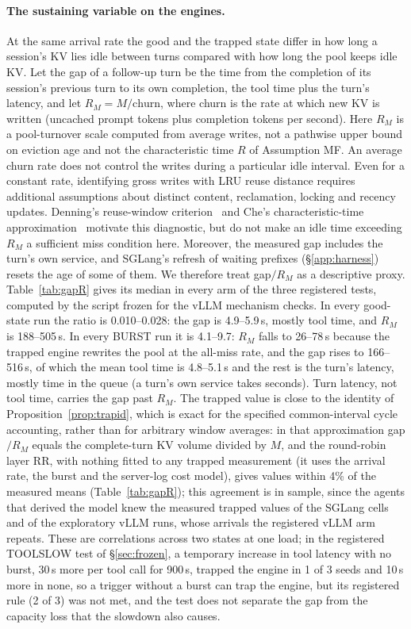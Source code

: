 \paragraph{The sustaining variable on the engines.}\label{sec:mechanism}
At the same arrival rate the good and the trapped state differ in how long a session's KV lies idle between turns compared with how long the pool keeps idle KV. Let the gap of a follow-up turn be the time from the completion of its session's previous turn to its own completion, the tool time plus the turn's latency, and let $R_M=M/\text{churn}$, where churn is the rate at which new KV is written (uncached prompt tokens plus completion tokens per second). Here $R_M$ is a pool-turnover scale computed from average writes, not a pathwise upper bound on eviction age and not the characteristic time $R$ of Assumption MF. An average churn rate does not control the writes during a particular idle interval. Even for a constant rate, identifying gross writes with LRU reuse distance requires additional assumptions about distinct content, reclamation, locking and recency updates. Denning's reuse-window criterion~\citep{denning1968working} and Che's characteristic-time approximation~\citep{che2002hierarchical} motivate this diagnostic, but do not make an idle time exceeding $R_M$ a sufficient miss condition here. Moreover, the measured gap includes the turn's own service, and SGLang's refresh of waiting prefixes (\S\ref{app:harness}) resets the age of some of them. We therefore treat gap$/R_M$ as a descriptive proxy. Table~\ref{tab:gapR} gives its median in every arm of the three registered tests, computed by the script frozen for the vLLM mechanism checks. In every good-state run the ratio is 0.010--0.028: the gap is 4.9--5.9\,s, mostly tool time, and $R_M$ is 188--505\,s. In every BURST run it is 4.1--9.7: $R_M$ falls to 26--78\,s because the trapped engine rewrites the pool at the all-miss rate, and the gap rises to 166--516\,s, of which the mean tool time is 4.8--5.1\,s and the rest is the turn's latency, mostly time in the queue (a turn's own service takes seconds). Turn latency, not tool time, carries the gap past $R_M$. The trapped value is close to the identity of Proposition~\ref{prop:trapid}, which is exact for the specified common-interval cycle accounting, rather than for arbitrary window averages: in that approximation gap$/R_M$ equals the complete-turn KV volume divided by $M$, and the round-robin layer RR, with nothing fitted to any trapped measurement (it uses the arrival rate, the burst and the server-log cost model), gives values within 4\% of the measured means (Table~\ref{tab:gapR}); this agreement is in sample, since the agents that derived the model knew the measured trapped values of the SGLang cells and of the exploratory vLLM runs, whose arrivals the registered vLLM arm repeats. These are correlations across two states at one load; in the registered TOOLSLOW test of \S\ref{sec:frozen}, a temporary increase in tool latency with no burst, 30\,s more per tool call for 900\,s, trapped the engine in 1 of 3 seeds and 10\,s more in none, so a trigger without a burst can trap the engine, but its registered rule (2 of 3) was not met, and the test does not separate the gap from the capacity loss that the slowdown also causes.

